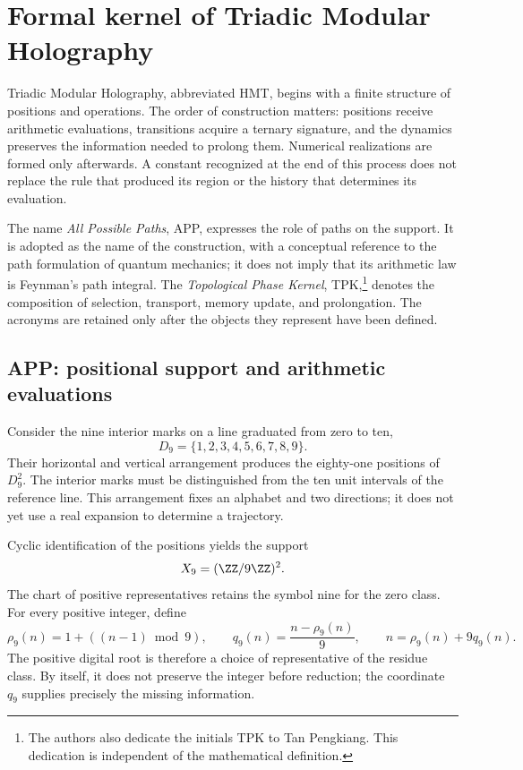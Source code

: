 \section{Formal kernel of Triadic Modular Holography}
\label{sec:nucleo}

Triadic Modular Holography, abbreviated HMT, begins with a finite structure of positions and operations. The order of construction matters: positions receive arithmetic evaluations, transitions acquire a ternary signature, and the dynamics preserves the information needed to prolong them. Numerical realizations are formed only afterwards. A constant recognized at the end of this process does not replace the rule that produced its region or the history that determines its evaluation.

The name \emph{All Possible Paths}, APP, expresses the role of paths on the support. It is adopted as the name of the construction, with a conceptual reference to the path formulation of quantum mechanics; it does not imply that its arithmetic law is Feynman's path integral. The \emph{Topological Phase Kernel}, TPK,\footnote{The authors also dedicate the initials TPK to Tan Pengkiang. This dedication is independent of the mathematical definition.} denotes the composition of selection, transport, memory update, and prolongation. The acronyms are retained only after the objects they represent have been defined.

\subsection{APP: positional support and arithmetic evaluations}

Consider the nine interior marks on a line graduated from zero to ten,
\[
 D_9=\{1,2,3,4,5,6,7,8,9\}.
\]
Their horizontal and vertical arrangement produces the eighty-one positions of \(D_9^2\). The interior marks must be distinguished from the ten unit intervals of the reference line. This arrangement fixes an alphabet and two directions; it does not yet use a real expansion to determine a trajectory.

Cyclic identification of the positions yields the support
\[
 X_9=(\ZZ/9\ZZ)^2.
\]
The chart of positive representatives retains the symbol nine for the zero class. For every positive integer, define
\begin{equation}
 \rho_9(n)=1+((n-1)\bmod9),\qquad
 q_9(n)=\frac{n-\rho_9(n)}9,
 \qquad n=\rho_9(n)+9q_9(n).
 \label{eq:residuo-cociente}
\end{equation}
The positive digital root is therefore a choice of representative of the residue class. By itself, it does not preserve the integer before reduction; the coordinate \(q_9\) supplies precisely the missing information.

